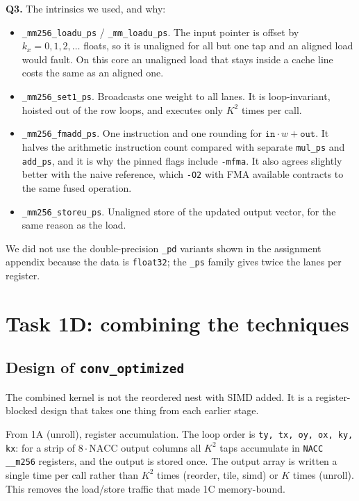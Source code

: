 \documentclass[11pt,a4paper]{article}
\begin{document}
\textbf{Q3.} The intrinsics we used, and why:
\begin{itemize}[nosep]
\item \texttt{\_mm256\_loadu\_ps} / \texttt{\_mm\_loadu\_ps}. The input pointer is offset by $k_x = 0,1,2,\dots$ floats, so it is unaligned for all but one tap and an aligned load would fault. On this core an unaligned load that stays inside a cache line costs the same as an aligned one.
\item \texttt{\_mm256\_set1\_ps}. Broadcasts one weight to all lanes. It is loop-invariant, hoisted out of the row loops, and executes only $K^2$ times per call.
\item \texttt{\_mm256\_fmadd\_ps}. One instruction and one rounding for $\texttt{in}\cdot w + \texttt{out}$. It halves the arithmetic instruction count compared with separate \texttt{mul\_ps} and \texttt{add\_ps}, and it is why the pinned flags include \texttt{-mfma}. It also agrees slightly better with the naive reference, which \texttt{-O2} with FMA available contracts to the same fused operation.
\item \texttt{\_mm256\_storeu\_ps}. Unaligned store of the updated output vector, for the same reason as the load.
\end{itemize}
We did not use the double-precision \texttt{\_pd} variants shown in the assignment appendix because the data is \texttt{float32}; the \texttt{\_ps} family gives twice the lanes per register.

\section{Task 1D: combining the techniques}
\label{sec:1d}

\subsection{Design of \texttt{conv\_optimized}}

The combined kernel is not the reordered nest with SIMD added. It is a register-blocked design that takes one thing from each earlier stage.

From 1A (unroll), register accumulation. The loop order is \texttt{ty, tx, oy, ox, ky, kx}: for a strip of $8\cdot\text{NACC}$ output columns all $K^2$ taps accumulate in \texttt{NACC} \texttt{\_\_m256} registers, and the output is stored once. The output array is written a single time per call rather than $K^2$ times (reorder, tile, simd) or $K$ times (unroll). This removes the load/store traffic that made 1C memory-bound.
\end{document}
